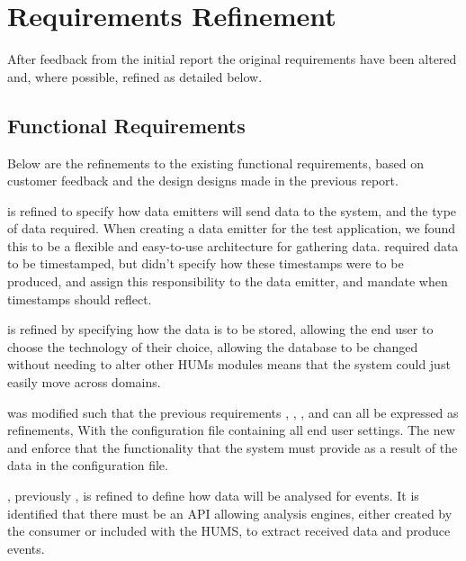 \section{Requirements Refinement}
\label{sec:requirements}
After feedback from the initial report the original requirements have been altered and, where possible, refined as detailed below.

\subsection{Functional Requirements}
\label{sec:requirements-functional}
Below are the refinements to the existing functional requirements, based on customer feedback and the design designs made in the previous report.

 is refined to specify how data emitters will send data to the system, and the type of data required. When creating a data emitter for the test application, we found this to be a flexible and easy-to-use architecture for gathering data. 
 required data to be timestamped, but didn't specify how these timestamps were to be produced,  and  assign this
responsibility to the data emitter, and mandate when timestamps
should reflect.

 is refined by specifying how the data is to be stored, allowing the end user to choose the technology of their choice, allowing the database to be changed without needing to alter other HUMs modules means that the system could just easily move across domains.

 was modified such that the previous requirements , , , and  can all be expressed as refinements, With the configuration file containing all end user settings. The new  and  enforce that the  functionality that the system must provide as a result of the data in the configuration file.

, previously , is refined to define how data will be analysed for events. It is identified that there must be an API allowing analysis engines, either created by the consumer or included with the HUMS, to extract received data and produce events. 

